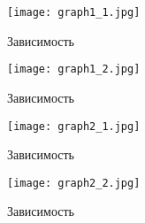 \documentclass[a4paper,12pt]{article}
\newcounter{first}
\begin{document}
\setcounter{figure}{0}
\setcounter{first}{1}
\renewcommand{\figurename}{График}

\begin{figure}[htpb!]
\centering
\texttt{[image: graph1\_1.jpg]}
\caption{Зависимость}
\end{figure}

\begin{figure}[htpb!]
\centering
\texttt{[image: graph1\_2.jpg]}
\caption{Зависимость}
\end{figure}

\setcounter{figure}{0} 

\begin{figure}[htpb!]
\centering
\texttt{[image: graph2\_1.jpg]}
\caption{Зависимость}
\end{figure}

\begin{figure}[htpb!]
\centering
\texttt{[image: graph2\_2.jpg]}
\caption{Зависимость}
\end{figure}
 
\end{document}

